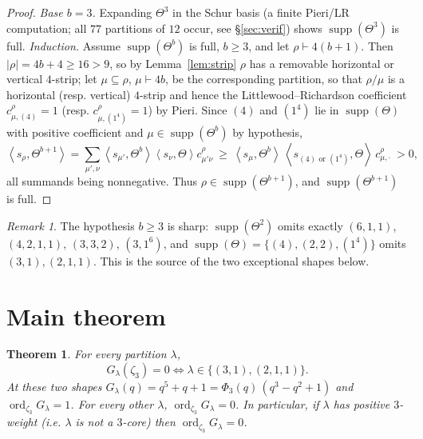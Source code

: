 \documentclass[11pt]{article}
\newtheorem{theorem}{Theorem}
\theoremstyle{definition}
\theoremstyle{remark}
\newtheorem{remark}{Remark}
\DeclareMathOperator{\ord}{ord}
\DeclareMathOperator{\supp}{supp}
\newcommand{\la}{\lambda}
\newcommand{\inner}[1]{\left\langle #1 \right\rangle}
\newcommand{\zt}{\zeta_3}
\begin{document}
\begin{proof}
\emph{Base $b=3$.} Expanding $\Theta^3$ in the Schur basis (a finite Pieri/LR
computation; all $77$ partitions of $12$ occur, see \S\ref{sec:verif}) shows
$\supp(\Theta^3)$ is full. \emph{Induction.} Assume $\supp(\Theta^{b})$ is full, $b\ge3$,
and let $\rho\vdash4(b+1)$. Then $|\rho|=4b+4\ge16>9$, so by Lemma~\ref{lem:strip}
$\rho$ has a removable horizontal or vertical $4$-strip; let $\mu\subseteq\rho$,
$\mu\vdash4b$, be the corresponding partition, so that $\rho/\mu$ is a horizontal (resp.
vertical) $4$-strip and hence the Littlewood--Richardson coefficient
$c^{\rho}_{\mu,(4)}=1$ (resp. $c^{\rho}_{\mu,(1^4)}=1$) by Pieri. Since $(4)$ and
$(1^4)$ lie in $\supp(\Theta)$ with positive coefficient and $\mu\in\supp(\Theta^{b})$
by hypothesis,
\[
  \inner{s_\rho,\Theta^{b+1}}=\sum_{\mu',\nu}\inner{s_{\mu'},\Theta^{b}}\inner{s_\nu,\Theta}
        c^{\rho}_{\mu'\nu}\ \ge\ \inner{s_{\mu},\Theta^{b}}\,\inner{s_{(4)\text{ or }(1^4)},\Theta}\,c^{\rho}_{\mu,\cdot}\ >0,
\]
all summands being nonnegative. Thus $\rho\in\supp(\Theta^{b+1})$, and
$\supp(\Theta^{b+1})$ is full.
\end{proof}

\begin{remark}
The hypothesis $b\ge3$ is sharp: $\supp(\Theta^{2})$ omits exactly $(6,1,1)$,
$(4,2,1,1)$, $(3,3,2)$, $(3,1^6)$, and $\supp(\Theta)=\{(4),(2,2),(1^4)\}$ omits
$(3,1),(2,1,1)$. This is the source of the two exceptional shapes below.
\end{remark}

\section{Main theorem}

\begin{theorem}\label{thm:main}
For every partition $\la$,
\[
  G_\la(\zt)=0 \iff \la\in\{(3,1),(2,1,1)\}.
\]
At these two shapes $G_\la(q)=q^5+q+1=\Phi_3(q)\,(q^3-q^2+1)$ and $\ord_{\zt}G_\la=1$.
For every other $\la$, $\ord_{\zt}G_\la=0$. In particular, if $\la$ has positive
$3$-weight (i.e. $\la$ is not a $3$-core) then $\ord_{\zt}G_\la=0$.
\end{theorem}
\end{document}
